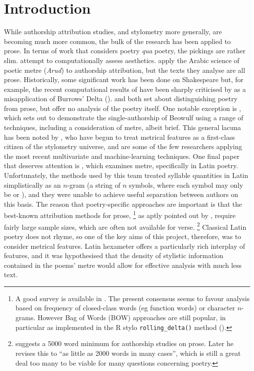\documentclass[11pt,a4paper]{scrartcl} %
\begin{document}
\section{Introduction}
While authorship attribution studies, and stylometry more generally, are becoming much more common, the bulk of the research has been applied to prose. In terms of work that considers poetry \textit{qua} poetry, the pickings are rather slim. \cite{kao_computational_2012} attempt to computationally assess aesthetics. \cite{omer_arud_2017} apply the Arabic science of poetic metre (\textit{Arud}) to authorship attribution, but the texts they analyse are all prose. Historically, some significant work has been done on Shakespeare but, for example, the recent computational results of \cite{ilsemann_christopher_2018} have been sharply criticised by \cite{barber_marlowe_2019} as a misapplication of Burrows' Delta (\cite{burrows_delta:_2002}). \cite{tizhoosh_poetic_2008} and \cite{chaudhuri_small_nodate} both set about distinguishing poetry from prose, but offer no analysis of the poetry itself. One notable exception is \cite{neidorf_large-scale_2019}, which sets out to demonstrate the single-authorship of Beowulf using a range of techniques, including a consideration of metre, albeit brief. This general lacuna has been noted by \cite{plechac_versification_2019}, who have begun to treat metrical features as a first-class citizen of the stylometry universe, and are some of the few researchers applying the most recent multivariate and machine-learning techniques. One final paper that deserves attention is \cite{forstall_evidence_2011}, which examines metre, specifically in Latin poetry. Unfortunately, the methods used by this team treated syllable quantities in Latin simplistically as an $n$-gram (a string of $n$ symbols, where each symbol may only be  or \metricsymbols{_}), and they were unable to achieve useful separation between authors on this basis. The reason that poetry-specific approaches are important is that the best-known attribution methods for prose,%
%
\footnote{A good survey is available in \cite{jockers_comparative_2010}. The present consensus seems to favour analysis based on frequency of closed-class words (eg function words) or character $n$-grams. However Bag of Words (BOW) approaches are still popular, in particular as implemented in the R stylo \texttt{rolling\_delta()} method (\cite{r_stylo}).}
as aptly pointed out by \cite{eder_does_2015}, require fairly large sample sizes, which are often not available for verse.%
%
\footnote{\cite{eder_does_2015} suggests a 5000 word minimum for authorship studies on prose. Later \cite[4]{eder_short_2017} he revises this to ``as little as 2000 words in many cases'', which is still a great deal too many to be viable for many questions concerning poetry.}
%
Classical Latin poetry does not rhyme, so one of the key aims of this project, therefore, was to consider metrical features. Latin hexameter offers a particularly rich interplay of features, and it was hypothesised that the density of stylistic information contained in the poems' metre would allow for effective analysis with much less text.
\end{document}
